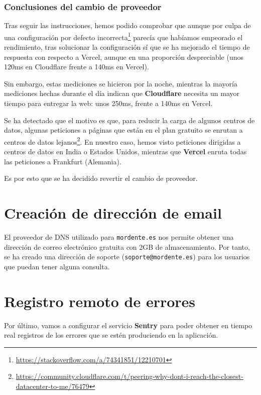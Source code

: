 \subsubsection{Conclusiones del cambio de proveedor}

Tras seguir las instrucciones, hemos podido comprobar que aunque por culpa de una configuración por defecto incorrecta\footnote{\url{https://stackoverflow.com/a/74341851/12210701}} parecía que habíamos empeorado el rendimiento, tras solucionar la configuración sí que se ha mejorado el tiempo de respuesta con respecto a Vercel, aunque en una proporción despreciable (unos 120ms en Cloudflare frente a 140ms en Vercel).

Sin embargo, estas mediciones se hicieron por la noche, mientras la mayoría mediciones hechas durante el día indican que \textbf{Cloudflare} necesita un mayor tiempo para entregar la web: unos 250ms, frente a 140ms en Vercel.

Se ha detectado que el motivo es que, para reducir la carga de algunos centros de datos, algunas peticiones a páginas que están en el plan gratuito se enrutan a centros de datos lejanos\footnote{\url{https://community.cloudflare.com/t/peering-why-dont-i-reach-the-closest-datacenter-to-me/76479}}. En nuestro caso, hemos visto peticiones dirigidas a centros de datos en India o Estados Unidos, mientras que \textbf{Vercel} enruta todas las peticiones a Frankfurt (Alemania).

Es por esto que se ha decidido revertir el cambio de proveedor.


\section{Creación de dirección de email}

El proveedor de DNS utilizado para \texttt{mordente.es} nos permite obtener una dirección de correo electrónico gratuita con 2GB de almacenamiento. Por tanto, se ha creado una dirección 
de soporte (\texttt{soporte@mordente.es}) para los usuarios que puedan tener alguna consulta.

\section{Registro remoto de errores}\label{subsection:sentry}

Por último, vamos a configurar el servicio \textbf{Sentry} para poder obtener en tiempo real registros de los errores que se estén produciendo en la aplicación.

